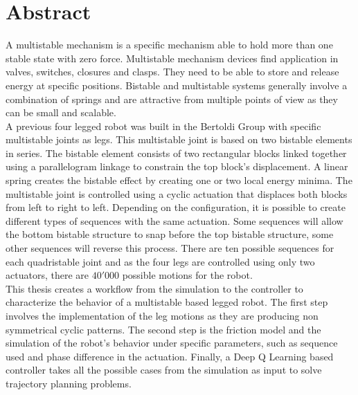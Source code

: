 \section*{Abstract}
%
    A multistable mechanism is a specific mechanism able to hold more than one stable state with zero force. Multistable mechanism devices find application in valves, switches, closures and clasps. They need to be able to store and release energy at specific positions. Bistable and multistable systems generally involve a combination of springs and are attractive from multiple points of view as they can be small and scalable.\\
    
    A previous four legged robot was built in the Bertoldi Group with specific multistable joints as legs. This multistable joint is based on two bistable elements in series. The bistable element consists of two rectangular blocks linked together using a parallelogram linkage to constrain the top block's displacement. A linear spring creates the bistable effect by creating one or two local energy minima. The multistable joint is controlled using a cyclic actuation that displaces both blocks from left to right to left. Depending on the configuration, it is possible to create different types of sequences with the same actuation. Some sequences will allow the bottom bistable structure to snap before the top bistable structure, some other sequences will reverse this process. There are ten possible sequences for each quadristable joint and as the four legs are controlled using only two actuators, there are $40'000$ possible motions for the robot.\\
    
    This thesis creates a workflow from the simulation to the controller to characterize the behavior of a multistable based legged robot. The first step involves the implementation of the leg motions as they are producing non symmetrical cyclic patterns. The second step is the friction model and the simulation of the robot's behavior under specific parameters, such as sequence used and phase difference in the actuation. Finally, a Deep Q Learning based controller takes all the possible cases from the simulation as input to solve trajectory planning problems. \\
    
